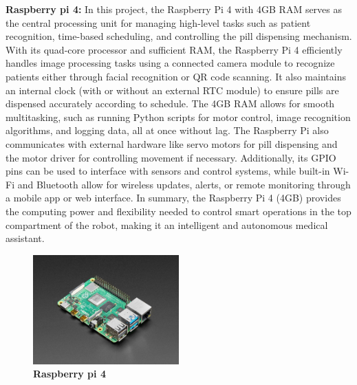 \textbf{Raspberry pi 4:} In this project, the Raspberry Pi 4 with 4GB RAM serves as the central processing unit for managing high-level tasks such as patient recognition, time-based scheduling, and controlling the pill dispensing mechanism. With its quad-core processor and sufficient RAM, the Raspberry Pi 4 efficiently handles image processing tasks using a connected camera module to recognize patients either through facial recognition or QR code scanning. It also maintains an internal clock (with or without an external RTC module) to ensure pills are dispensed accurately according to schedule. The 4GB RAM allows for smooth multitasking, such as running Python scripts for motor control, image recognition algorithms, and logging data, all at once without lag. The Raspberry Pi also communicates with external hardware like servo motors for pill dispensing and the motor driver for controlling movement if necessary. Additionally, its GPIO pins can be used to interface with sensors and control systems, while built-in Wi-Fi and Bluetooth allow for wireless updates, alerts, or remote monitoring through a mobile app or web interface. In summary, the Raspberry Pi 4 (4GB) provides the computing power and flexibility needed to control smart operations in the top compartment of the robot, making it an intelligent and autonomous medical assistant.

\begin{figure}[htbp!]
\centering
\includegraphics[width=0.5\textwidth,height=0.5\textwidth]{images/fig3.2.jpg}
\caption{\textbf{Raspberry pi 4}}
\label{fig:3.2}
\end{figure}

\vspace{1.5\baselineskip} %

